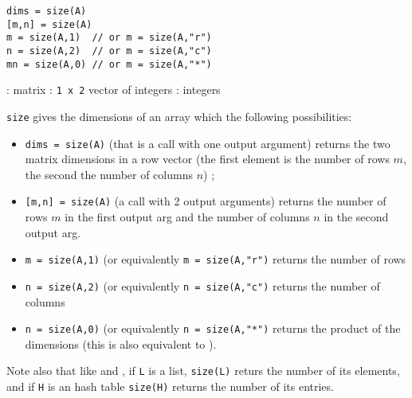 
\begin{mandesc}
\end{mandesc}
\begin{calling_sequence}
\begin{verbatim}
dims = size(A)
[m,n] = size(A)
m = size(A,1)  // or m = size(A,"r")
n = size(A,2)  // or m = size(A,"c")
mn = size(A,0) // or m = size(A,"*")   
\end{verbatim}
\end{calling_sequence}

\begin{parameters}
  \begin{varlist}
    : matrix
    : \verb+1 x 2+ vector of integers
    : integers
  \end{varlist}
\end{parameters}

\begin{mandescription}
\verb+size+ gives the dimensions of an array which the following possibilities:
\begin{itemize}
  \item \verb!dims = size(A)! (that is a call with one output argument) returns the two matrix dimensions in a row vector 
        (the first element is the number of rows $m$, the second the number of columns $n$) ;
  \item \verb![m,n] = size(A)! (a call with 2 output arguments) returns the number of rows $m$ in the first output arg
        and the number of columns $n$ in the second output arg.
  \item \verb!m = size(A,1)! (or equivalently \verb!m = size(A,"r")! returns the number of rows
  \item \verb!n = size(A,2)! (or equivalently \verb!n = size(A,"c")! returns the number of columns
  \item \verb!n = size(A,0)! (or equivalently \verb!n = size(A,"*")! returns the product of the dimensions (this is
        also equivalent to ).
\end{itemize}

Note also that like  and , if \verb+L+ is a list, 
\verb+size(L)+ returs the number of its elements, and if \verb+H+ is an hash table \verb+size(H)+ 
returns the number of its entries.
\end{mandescription}

